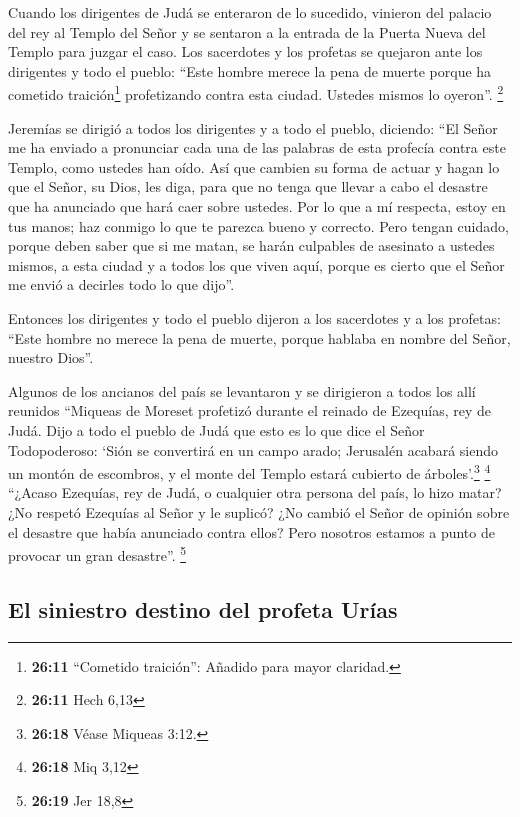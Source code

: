  Cuando los dirigentes de Judá se enteraron de lo
sucedido, vinieron del palacio del rey al Templo del Señor y se sentaron
a la entrada de la Puerta Nueva del Templo para juzgar el caso.
 Los sacerdotes y los profetas se quejaron ante los
dirigentes y todo el pueblo: ``Este hombre merece la pena de muerte
porque ha cometido traición\footnote{\textbf{26:11} ``Cometido
  traición'': Añadido para mayor claridad.} profetizando contra esta
ciudad. Ustedes mismos lo oyeron''. \footnote{\textbf{26:11} Hech 6,13}

 Jeremías se dirigió a todos los dirigentes y a todo el
pueblo, diciendo: ``El Señor me ha enviado a pronunciar cada una de las
palabras de esta profecía contra este Templo, como ustedes han oído.
 Así que cambien su forma de actuar y hagan lo que el
Señor, su Dios, les diga, para que no tenga que llevar a cabo el
desastre que ha anunciado que hará caer sobre ustedes. 
Por lo que a mí respecta, estoy en tus manos; haz conmigo lo que te
parezca bueno y correcto.  Pero tengan cuidado, porque
deben saber que si me matan, se harán culpables de asesinato a ustedes
mismos, a esta ciudad y a todos los que viven aquí, porque es cierto que
el Señor me envió a decirles todo lo que dijo''.

 Entonces los dirigentes y todo el pueblo dijeron a los
sacerdotes y a los profetas: ``Este hombre no merece la pena de muerte,
porque hablaba en nombre del Señor, nuestro Dios''.

 Algunos de los ancianos del país se levantaron y se
dirigieron a todos los allí reunidos  ``Miqueas de
Moreset profetizó durante el reinado de Ezequías, rey de Judá. Dijo a
todo el pueblo de Judá que esto es lo que dice el Señor Todopoderoso:
`Sión se convertirá en un campo arado; Jerusalén acabará siendo un
montón de escombros, y el monte del Templo estará cubierto de
árboles'.\footnote{\textbf{26:18} Véase Miqueas 3:12.} \footnote{\textbf{26:18}
  Miq 3,12}  ``¿Acaso Ezequías, rey de Judá, o cualquier
otra persona del país, lo hizo matar? ¿No respetó Ezequías al Señor y le
suplicó? ¿No cambió el Señor de opinión sobre el desastre que había
anunciado contra ellos? Pero nosotros estamos a punto de provocar un
gran desastre''. \footnote{\textbf{26:19} Jer 18,8}

\hypertarget{el-siniestro-destino-del-profeta-uruxedas}{%
\subsection{El siniestro destino del profeta
Urías}\label{el-siniestro-destino-del-profeta-uruxedas}}


